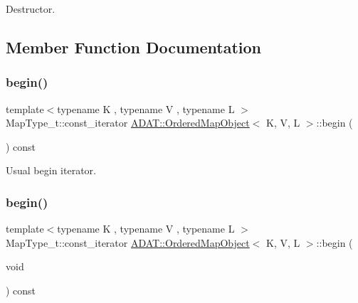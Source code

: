 Destructor. 



\subsection{Member Function Documentation}
\mbox{\label{classADAT_1_1OrderedMapObject_afe44774d4a446c8f66ea5d6bd2c5d59f}} 
\subsubsection{\texorpdfstring{begin()}{begin()}\hspace{0.1cm}{\footnotesize\ttfamily [1/2]}}
{\footnotesize\ttfamily template$<$typename K , typename V , typename L $>$ \\
Map\+Type\+\_\+t\+::const\+\_\+iterator \mbox{\hyperlink{classADAT_1_1OrderedMapObject}{A\+D\+A\+T\+::\+Ordered\+Map\+Object}}$<$ K, V, L $>$\+::begin (\begin{DoxyParamCaption}{ }\end{DoxyParamCaption}) const\hspace{0.3cm}{\ttfamily [inline]}}



Usual begin iterator. 

\mbox{\label{classADAT_1_1OrderedMapObject_afe44774d4a446c8f66ea5d6bd2c5d59f}} 
\subsubsection{\texorpdfstring{begin()}{begin()}\hspace{0.1cm}{\footnotesize\ttfamily [2/2]}}
{\footnotesize\ttfamily template$<$typename K , typename V , typename L $>$ \\
Map\+Type\+\_\+t\+::const\+\_\+iterator \mbox{\hyperlink{classADAT_1_1OrderedMapObject}{A\+D\+A\+T\+::\+Ordered\+Map\+Object}}$<$ K, V, L $>$\+::begin (\begin{DoxyParamCaption}\item[{void}]{ }\end{DoxyParamCaption}) const\hspace{0.3cm}{\ttfamily [inline]}}



